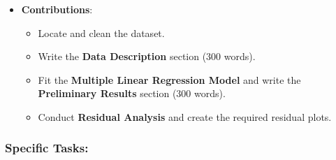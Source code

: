 \documentclass[
  letterpaper,
  DIV=11,
  numbers=noendperiod]{scrartcl}
\providecommand{\tightlist}{%
  \setlength{\itemsep}{0pt}\setlength{\parskip}{0pt}}\usepackage{longtable,booktabs,array}
\begin{document}
\begin{itemize}
\tightlist
\item
  \textbf{Contributions}:

  \begin{itemize}
  \tightlist
  \item
    Locate and clean the dataset.
  \item
    Write the \textbf{Data Description} section (300 words).
  \item
    Fit the \textbf{Multiple Linear Regression Model} and write the
    \textbf{Preliminary Results} section (300 words).
  \item
    Conduct \textbf{Residual Analysis} and create the required residual
    plots.
  \end{itemize}
\end{itemize}

\subsubsection{Specific Tasks:}\label{specific-tasks}
\end{document}
